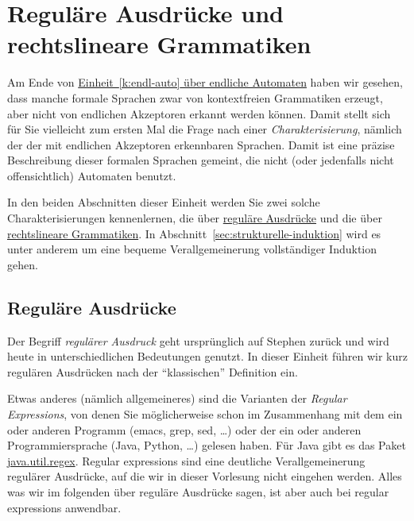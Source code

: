 \Tut\chapter{Regul\"are Ausdr\"ucke und rechtslineare Grammatiken}
\label{k:reg-ausdruecke}

Am Ende von \hyperref[k:endl-auto]{Einheit~\ref{k:endl-auto} über
  endliche Automaten} haben wir gesehen, dass manche formale Sprachen
zwar von kontextfreien Grammatiken erzeugt, aber nicht von endlichen
Akzeptoren erkannt werden können. Damit stellt sich für Sie vielleicht
zum ersten Mal die Frage nach einer \emph{Charakterisierung}, nämlich
der der mit endlichen Akzeptoren erkennbaren Sprachen. Damit ist eine
präzise Beschreibung dieser formalen Sprachen gemeint, die nicht (oder
jedenfalls nicht offensichtlich) Automaten benutzt.

In den beiden Abschnitten dieser Einheit werden Sie zwei solche
Charakterisierungen kennenlernen, die über
\hyperref[sec:reg-ausdruecke]{reguläre Ausdrücke} und die über
\hyperref[sec:rechtslineare-grammatiken]{rechtslineare
  Grammatiken}. In Abschnitt~\ref{sec:strukturelle-induktion} wird es
unter anderem um eine bequeme Verallgemeinerung vollständiger
Induktion gehen.

\Tut\section{Regul\"are Ausdr\"ucke}
\label{sec:reg-ausdruecke}

Der Begriff \emph{regulärer Ausdruck} geht ursprünglich auf Stephen
\textcite{Kleene_1956_REN_ic} zurück und
wird heute in unterschiedlichen Bedeutungen genutzt.  In dieser
Einheit führen wir kurz regulären Ausdrücken nach der "`klassischen"'
Definition ein.

Etwas anderes (nämlich allgemeineres) sind die Varianten der
\emph{Regular Expressions}, von denen Sie möglicherweise schon im
Zusammenhang mit dem ein oder anderen Programm (emacs, grep, sed,
\dots) oder der ein oder anderen Programmiersprache (Java, Python,
\dots) gelesen haben. Für Java gibt es das Paket
\href{http://java.sun.com/javase/6/docs/api/java/util/regex/package-summary.html}{java.util.regex}.
Regular expressions sind eine deutliche Verallgemeinerung regulärer
Ausdrücke, auf die wir in dieser Vorlesung nicht eingehen werden.
Alles was wir im folgenden über reguläre Ausdrücke sagen, ist aber
auch bei regular expressions anwendbar.

